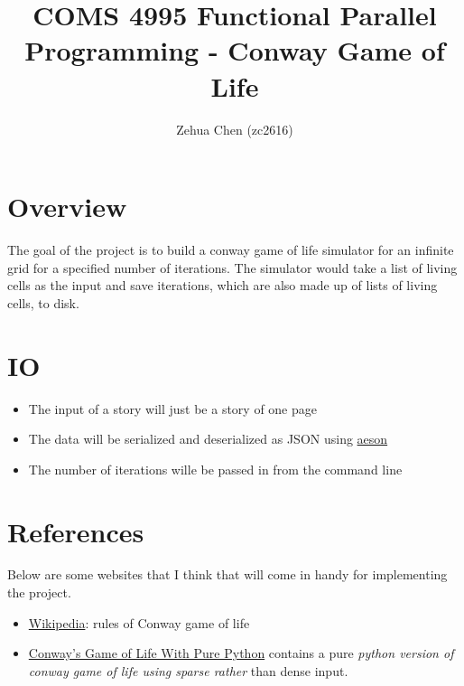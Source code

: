 \documentclass{article}
\title{COMS 4995 Functional Parallel Programming - Conway Game of Life}
\author{Zehua Chen (zc2616)}
\begin{document}
  \maketitle

  \section{Overview}

    The goal of the project is to build a conway game of life simulator for
    an infinite grid for a specified number of iterations. The simulator would
    take a list of living cells as the input and save iterations, which are
    also made up of lists of living cells, to disk.

  \section{IO}

    

    \begin{itemize}
      \item The input of a story will just be a story of one page
      \item The data will be serialized and deserialized as JSON using
      \href{https://hackage.haskell.org/package/aeson}{aeson}
      \item The number of iterations wille be passed in from the command line
    \end{itemize}

  \section{References}

    Below are some websites that I think that will come in handy for implementing
    the project.

    \begin{itemize}
      \item \href{https://en.wikipedia.org/wiki/Conway%27s_Game_of_Life}{Wikipedia}:
      rules of Conway game of life
      \item \href{https://www.madelyneriksen.com/python-game-of-life}{Conway's Game of Life With Pure Python}
      contains a pure \emph{python version of conway game of life using sparse rather}
      than dense input.
    \end{itemize}
\end{document}
